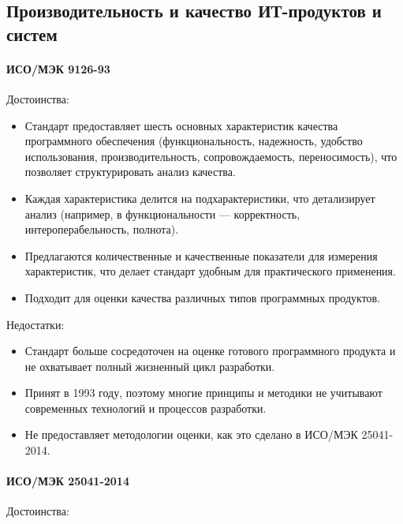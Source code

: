 \subsection{Производительность и качество ИТ-продуктов и систем}

\paragraph{ИСО/МЭК 9126-93}

Достоинства:

\begin{itemize}
	\item Стандарт предоставляет шесть основных характеристик
		качества программного обеспечения (функциональность, надежность,
		удобство использования, производительность,
		сопровождаемость, переносимость),
		что позволяет структурировать анализ качества.
	\item Каждая характеристика делится на подхарактеристики,
		что детализирует анализ (например,
		в функциональности --- корректность, интероперабельность, полнота).
	\item Предлагаются количественные и качественные показатели
		для измерения характеристик,
		что делает стандарт удобным для практического применения.
	\item Подходит для оценки качества различных типов программных продуктов.
\end{itemize}

Недостатки:

\begin{itemize}
	\item Стандарт больше сосредоточен на оценке готового программного продукта
		и не охватывает полный жизненный цикл разработки.
	\item Принят в 1993 году, поэтому многие принципы
		и методики не учитывают современных технологий
		и процессов разработки.
	\item Не предоставляет методологии оценки,
		как это сделано в ИСО/МЭК 25041-2014.
\end{itemize}

\paragraph{ИСО/МЭК 25041-2014}

Достоинства:


